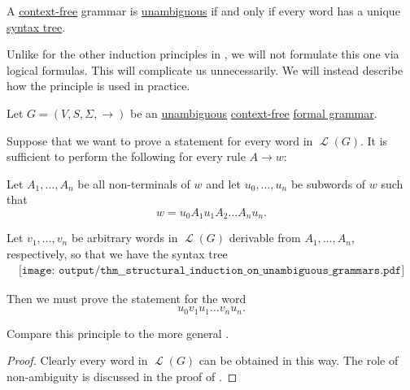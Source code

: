\begin{proposition}\label{thm:unambiguous_grammar_syntax_trees}
  A \hyperref[def:chomsky_hierarchy/context_free]{context-free} grammar is \hyperref[def:chomsky_hierarchy/context_free]{unambiguous} if and only if every word has a unique \hyperref[def:grammar_syntax_tree]{syntax tree}.
\end{proposition}

\begin{theorem}\label{thm:structural_induction_on_unambiguous_grammars}\mimprovised
  Unlike for the other induction principles in , we will not formulate this one via logical formulas. This will complicate us unnecessarily. We will instead describe how the principle is used in practice.

  Let \( G = (V, S, \Sigma, \to) \) be an \hyperref[def:chomsky_hierarchy/context_free]{unambiguous} \hyperref[def:chomsky_hierarchy/context_free]{context-free} \hyperref[def:formal_grammar]{formal grammar}.

  Suppose that we want to prove a statement for every word in \( \mscrL(G) \). It is sufficient to perform the following for every rule \( A \to w \):
  \begin{displayquote}
    Let \( A_1, \ldots, A_n \) be all non-terminals of \( w \) and let \( u_0, \ldots, u_n \) be subwords of \( w \) such that
    \begin{equation*}
      w = u_0 A_1 u_1 A_2 \ldots A_n u_n.
    \end{equation*}

    Let \( v_1, \ldots, v_n \) be arbitrary words in \( \mscrL(G) \) derivable from \( A_1, \ldots, A_n \), respectively, so that we have the syntax tree
    \begin{equation*}
      \begin{aligned}
        \texttt{[image: output/thm\_\_structural\_induction\_on\_unambiguous\_grammars.pdf]}
      \end{aligned}
    \end{equation*}

    Then we must prove the statement for the word
    \begin{equation*}
      u_0 v_1 u_1 \ldots v_n u_n.
    \end{equation*}
  \end{displayquote}

  Compare this principle to the more general .
\end{theorem}
\begin{proof}
  Clearly every word in \( \mscrL(G) \) can be obtained in this way.
  The role of non-ambiguity is discussed in the proof of .
\end{proof}
